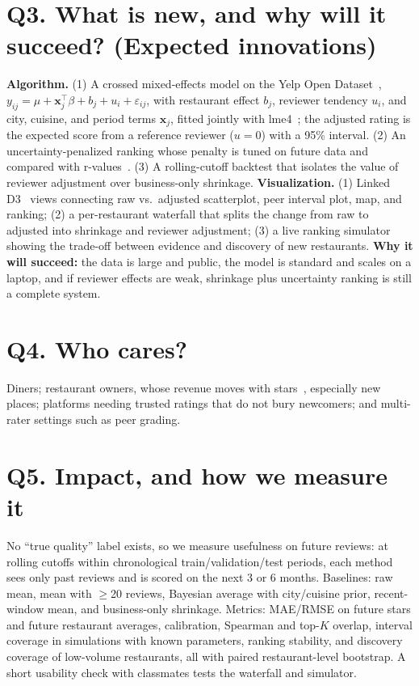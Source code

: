 \documentclass[11pt,letterpaper]{article}
\begin{document}
\section{Q3. What is new, and why will it succeed? (Expected innovations)}
\textbf{Algorithm.} (1) A crossed mixed-effects model on the Yelp Open Dataset~\cite{yelp}, $y_{ij}=\mu+\mathbf{x}_j^\top\beta+b_j+u_i+\varepsilon_{ij}$, with restaurant effect $b_j$, reviewer tendency $u_i$, and city, cuisine, and period terms $\mathbf{x}_j$, fitted jointly with lme4~\cite{bates2015}; the adjusted rating is the expected score from a reference reviewer ($u=0$) with a 95\% interval. (2) An uncertainty-penalized ranking whose penalty is tuned on future data and compared with r-values~\cite{henderson2016}. (3) A rolling-cutoff backtest that isolates the value of reviewer adjustment over business-only shrinkage. \textbf{Visualization.} (1) Linked D3~\cite{bostock2011} views connecting raw vs.\ adjusted scatterplot, peer interval plot, map, and ranking; (2) a per-restaurant waterfall that splits the change from raw to adjusted into shrinkage and reviewer adjustment; (3) a live ranking simulator showing the trade-off between evidence and discovery of new restaurants. \textbf{Why it will succeed:} the data is large and public, the model is standard and scales on a laptop, and if reviewer effects are weak, shrinkage plus uncertainty ranking is still a complete system.

\section{Q4. Who cares?}
Diners; restaurant owners, whose revenue moves with stars~\cite{luca2016}, especially new places; platforms needing trusted ratings that do not bury newcomers; and multi-rater settings such as peer grading.

\section{Q5. Impact, and how we measure it}
No ``true quality'' label exists, so we measure usefulness on future reviews: at rolling cutoffs within chronological train/validation/test periods, each method sees only past reviews and is scored on the next 3 or 6 months. Baselines: raw mean, mean with $\geq$20 reviews, Bayesian average with city/cuisine prior, recent-window mean, and business-only shrinkage. Metrics: MAE/RMSE on future stars and future restaurant averages, calibration, Spearman and top-$K$ overlap, interval coverage in simulations with known parameters, ranking stability, and discovery coverage of low-volume restaurants, all with paired restaurant-level bootstrap. A short usability check with classmates tests the waterfall and simulator.
\end{document}
